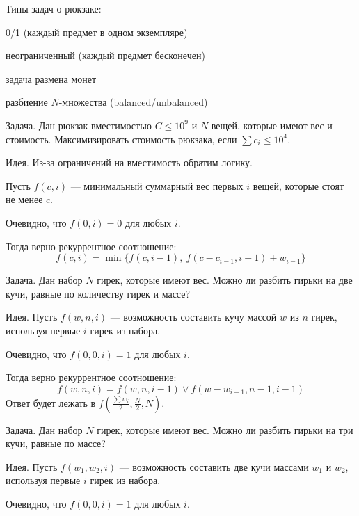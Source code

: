 {\bold Типы} задач о рюкзаке:
\begin{list*}
\item 0/1 {\ital\color{desc} (каждый предмет в одном экземпляре)}
\item неограниченный {\ital\color{desc} (каждый предмет бесконечен)}
\item задача размена монет
\item разбиение $N$-множества {\ital (balanced/unbalanced)}
\end{list*}

\begin{theorem}
{\bold Задача.} Дан рюкзак вместимостью $C\leq 10^9$ и $N$ вещей, которые имеют {\ital вес} и {\ital стоимость}. Максимизировать стоимость рюкзака, если $\sum c_i\leq 10^4$.
\end{theorem}

{\bold Идея.} Из-за ограничений на вместимость {\ital обратим логику}.

Пусть $f(c,i)$ --- минимальный суммарный вес первых $i$ вещей, которые стоят не менее $c$.

Очевидно, что $f(0,i)=0$ для любых $i$.

Тогда верно рекуррентное соотношение:
$$f(c,i)=\min\{f(c,i-1),\ f(c-c_{i-1},i-1)+w_{i-1}\}$$
\begin{theorem}
{\bold Задача.} Дан набор $N$ гирек, которые имеют {\ital вес}. Можно ли разбить гирьки на две кучи, равные по {\ital количеству гирек} и {\ital массе}?
\end{theorem}

{\bold Идея.} Пусть $f(w,n,i)$ --- возможность составить кучу массой $w$ из $n$ гирек, используя первые $i$ гирек из набора.

Очевидно, что $f(0,0,i)=1$ для любых $i$.

Тогда верно рекуррентное соотношение:
$$f(w,n,i)=f(w,n,i-1)\lor f(w-w_{i-1},n-1,i-1)$$
Ответ будет лежать в $f(\frac{\sum w_i}{2},\frac{N}{2},N)$.

\begin{theorem}
{\bold Задача.} Дан набор $N$ гирек, которые имеют {\ital вес}. Можно ли разбить гирьки на три кучи, равные по {\ital массе}?
\end{theorem}

{\bold Идея.} Пусть $f(w_1,w_2,i)$ --- возможность составить две кучи массами $w_1$ и $w_2$, используя первые $i$ гирек из набора.

Очевидно, что $f(0,0,i)=1$ для любых $i$.

